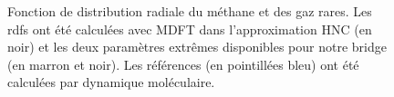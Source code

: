 \begin{figure}[ht]
\begin{subfigure}{.5\textwidth}
{
    }
  \end{subfigure}
  \caption[Fonction de distribution radiale du méthane et des gaz rares.]{Fonction de distribution radiale du méthane et des gaz rares. Les rdfs ont été calculées avec MDFT dans l'approximation HNC (en noir) et les deux paramètres extrêmes disponibles pour notre bridge (en marron et noir). Les références (en pointillées bleu) ont été calculées par dynamique moléculaire.}
  \label{fig:g_of_r_molecules_modeles}
\end{figure}

